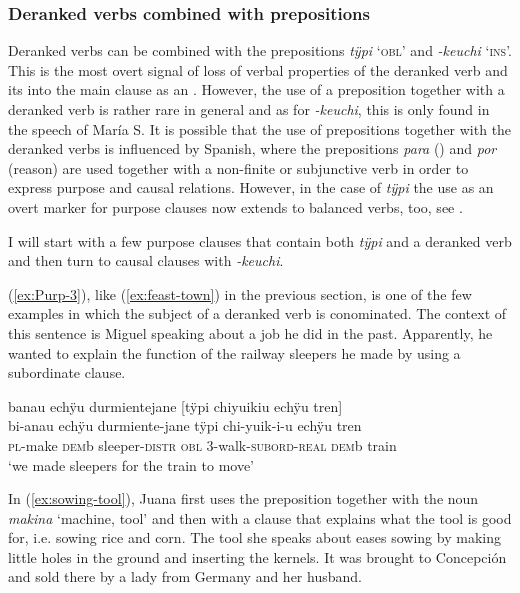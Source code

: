 \subsubsection{Deranked verbs combined with prepositions}\label{sec:EmbeddedAC_adp}

Deranked verbs can be combined with the prepositions \textit{tÿpi} ‘\textsc{obl}’ and \textit{-keuchi} ‘\textsc{ins}’. This is the most overt signal of loss of verbal properties of the deranked verb and its  into the main clause as an . However, the use of a preposition together with a deranked verb is rather rare in general and as for \textit{-keuchi}, this is only found in the speech of María S. It is possible that the use of prepositions together with the deranked verbs is influenced by Spanish, where the prepositions \textit{para} () and \textit{por} (reason) are used together with a non-finite or subjunctive verb in order to express purpose and causal relations. However, in the case of \textit{tÿpi} the use as an overt marker for purpose clauses now extends to balanced verbs, too, see  \citep[and also][142--143]{DanielsenTerhart2015}.

I will start with a few purpose clauses that contain both \textit{tÿpi} and a deranked verb and then turn to causal clauses with \textit{-keuchi}.

(\ref{ex:Purp-3}), like (\ref{ex:feast-town}) in the previous section, is one of the few examples in which the subject of a deranked verb is conominated. The context of this sentence is Miguel speaking about a job he did in the past. Apparently, he wanted to explain the function of the railway sleepers he made by using a subordinate clause.

\ea\label{ex:Purp-3}
\begingl
\glpreamble banau echÿu durmientejane \textup{[}tÿpi chiyuikiu echÿu tren\textup{]}\\
\gla bi-anau echÿu durmiente-jane tÿpi chi-yuik-i-u echÿu tren\\
\textsc{pl}-make \textsc{dem}b sleeper-\textsc{distr} \textsc{obl} 3-walk-\textsc{subord}-\textsc{real} \textsc{dem}b train\\
\glft ‘we made sleepers for the train to move’
\endgl
\trailingcitation{[mxx-p181027l-1.129]}
\xe


In (\ref{ex:sowing-tool}), Juana first uses the preposition together with the noun \textit{makina} ‘machine, tool’ and then with a clause that explains what the tool is good for, i.e. sowing rice and corn. The tool she speaks about eases sowing by making little holes in the ground and inserting the kernels. It was brought to Concepción and sold there by a lady from Germany and her husband.

